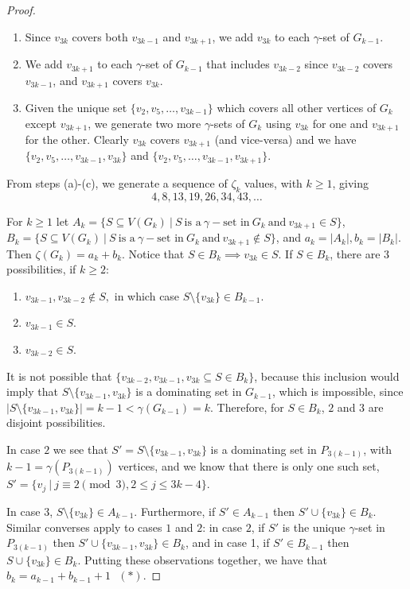 \documentclass[10pt,a4paper]{amsart}
\begin{document}
\begin{proof}
	\begin{enumerate}
		\item[(a)] Since $v_{3k}$ covers both $v_{3k-1}$ and $v_{3k+1}$, we add $v_{3k}$ to each $\gamma$-set of $G_{k-1}$.
		\item[(b)] We add $v_{3k+1}$ to each $\gamma$-set of $G_{k-1}$ that includes $v_{3k-2}$ since $v_{3k-2}$ covers $v_{3k-1}$, and $v_{3k+1}$ covers $v_{3k}$.
		\item[(c)] Given the unique set $\{v_2,v_5,\ldots,v_{3k-1}\}$ which covers all other vertices of $G_k$ except $v_{3k+1}$, we generate two more $\gamma$-sets of $G_k$ using $v_{3k}$ for one and $v_{3k+1}$ for the other. Clearly $v_{3k}$ covers $v_{3k+1}$ (and vice-versa) and we have $\{v_2,v_5,\ldots,v_{3k-1}, v_{3k}\}$ and $\{v_2,v_5,\ldots,v_{3k-1}, v_{3k+1}\}$. 
	\end{enumerate}
	From steps (a)-(c), we generate a sequence of $\zeta_k$ values, with $k\ge 1$, giving 
	$$4, 8, 13, 19, 26, 34, 43, \ldots  $$
	
	For $k\ge 1$ let $A_k=\{S\subseteq V(G_k)\ |\ S \ \text{is a}\ \gamma-\text{set in}\ G_k \ \text{and} \ v_{3k+1} \in S\}$,
	 $B_k=\{S\subseteq V(G_k)\ |\ S \ \text{is a}\ \gamma-\text{set in}\ G_k \ \text{and} \ v_{3k+1} \notin S\}$, and $a_k=|A_k|, b_k=|B_k|$. Then $\zeta(G_k)=a_k+b_k$. Notice that $S\in B_k \implies v_{3k}\in S$. If $S\in B_k$, there are $3$ possibilities, if $k\ge 2$:
	 \begin{enumerate}
	     \item $ v_{3k-1}, v_{3k-2} \notin S,$ in which case $S\setminus \{v_{3k}\}\in B_{k-1}.$
	      \item $ v_{3k-1} \in S.$ 
	      \item $ v_{3k-2} \in S.$ 
	 \end{enumerate}
	 
	\indent It is not possible that $\{  v_{3k-2}, v_{3k-1},  v_{3k}\subseteq S \in B_k\}$, because this inclusion would imply that $S\setminus \{v_{3k-1},  v_{3k}\} $ is a dominating set in $G_{k-1}$, which is impossible, since $|S\setminus \{v_{3k-1},  v_{3k}\}|=k-1<\gamma(G_{k-1})=k$. Therefore, for $S\in B_k$, $2$ and $3$ are disjoint possibilities.
	
	\indent In case $2$ we see that $S'=S\setminus \{v_{3k-1},  v_{3k}\}$ is a dominating set in $P_{3(k-1)}$, with $k-1=\gamma(P_{3(k-1)})$ vertices, and we know that there is only one such set, $S'=\{v_j\ | \ j\equiv 2\pmod 3, 2\le j \le 3k-4\}$.
	
	\indent In case $3$, $S\setminus \{  v_{3k}\}\in A_{k-1}$. Furthermore, if $S' \in A_{k-1}$ then $S'\cup\{v_{3k}\} \in B_k$. Similar converses apply to cases $1$ and $2$: in case $2$, if $S'$ is the unique $\gamma$-set in $P_{3(k-1)}$ then $S'\cup \{v_{3k-1},  v_{3k}\} \in B_k$, and in case 1, if $S' \in B_{k-1}$ then $S\cup \{v_{3k}\} \in B_k$. Putting these observations together, we have that $b_k=a_{k-1}+b_{k-1}+1 \ \ \ (*)$.%
	

\end{proof}
\end{document}
